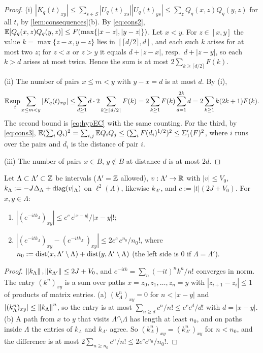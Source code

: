 \begin{proof}
(i) $|K_q(t)_{xy}|\le\sum_{s\in S}|U_q(t)_{xs}||U_q(t)_{ys}|\le\sum_z Q_q(x,z)Q_q(y,z)$ for all $t$, by
\cref{lem:consequences}(b).  By \eqref{eq:cons2},
$\mathbb{E}[Q_q(x,z)Q_q(y,z)]\le F(\max\{|x-z|,|y-z|\})$.  Let $x<y$.  For $z\in[x,y]$ the value
$k=\max\{z-x,y-z\}$ lies in $[\lceil d/2\rceil,d]$, and each such $k$ arises for at most two $z$; for $z<x$
or $z>y$ it equals $d+|z-x|$, resp.\ $d+|z-y|$, so each $k>d$ arises at most twice.  Hence the sum is at
most $2\sum_{k\ge\lceil d/2\rceil}F(k)$.

(ii) The number of pairs $x\le m<y$ with $y-x=d$ is at most $d$.  By (i),
\[
  \mathbb{E}\sup_t\sum_{x\le m<y}|K_q(t)_{xy}|\le\sum_{d\ge1}d\cdot2\sum_{k\ge\lceil d/2\rceil}F(k)
  =2\sum_{k\ge1}F(k)\sum_{d=1}^{2k}d=2\sum_{k\ge1}k(2k+1)F(k).
\]
The second bound is \eqref{eq:hypEC} with the same counting.  For the third, by \eqref{eq:cons3},
$\mathbb{E}(\sum_iQ_i)^2=\sum_{i,j}\mathbb{E} Q_iQ_j\le(\sum_iF(d_i)^{1/2})^2\le\Sigma_1'(F)^2$, where $i$ runs over the pairs
and $d_i$ is the distance of pair $i$.

(iii) The number of pairs $x\in B$, $y\notin B$ at distance $d$ is at most $2d$.
\end{proof}

\begin{lemma}\label{lem:propagation}
Let $\Lambda\subset\Lambda'\subset\mathbb{Z}$ be intervals ($\Lambda'=\mathbb{Z}$ allowed), $v:\Lambda'\to\mathbb{R}$ with $|v|\le V_0$,
$k_{\Lambda}:=-J\Delta_\Lambda+\operatorname{diag}(v|_\Lambda)$ on $\ell^2(\Lambda)$, likewise $k_{\Lambda'}$, and $c:=|t|(2J+V_0)$.  For
$x,y\in\Lambda$:
\begin{enumerate}[label=(\alph*)]
\item $|(e^{-itk_\Lambda})_{xy}|\le e^{c}\,c^{|x-y|}/|x-y|!$;
\item $|(e^{-itk_\Lambda})_{xy}-(e^{-itk_{\Lambda'}})_{xy}|\le2e^{c}\,c^{n_0}/n_0!$, where
$n_0:=\operatorname{dist}(x,\Lambda'\setminus\Lambda)+\operatorname{dist}(y,\Lambda'\setminus\Lambda)$ (the left side is $0$ if $\Lambda=\Lambda'$).
\end{enumerate}
\end{lemma}

\begin{proof}
$\left\|k_\Lambda\right\|,\left\|k_{\Lambda'}\right\|\le2J+V_0$, and $e^{-itk}=\sum_n(-it)^nk^n/n!$ converges in norm.  The
entry $(k^n)_{xy}$ is a sum over paths $x=z_0,z_1,\dots,z_n=y$ with $|z_{i+1}-z_i|\le1$ of products of matrix
entries.  (a) $(k_\Lambda^n)_{xy}=0$ for $n<|x-y|$ and $|(k^n_\Lambda)_{xy}|\le\left\|k_\Lambda\right\|^n$, so the entry is at
most $\sum_{n\ge d}c^n/n!\le e^cc^d/d!$ with $d=|x-y|$.  (b) A path from $x$ to $y$ that visits
$\Lambda'\setminus\Lambda$ has length at least $n_0$, and on paths inside $\Lambda$ the entries of $k_\Lambda$ and
$k_{\Lambda'}$ agree.  So $(k_\Lambda^n)_{xy}=(k^n_{\Lambda'})_{xy}$ for $n<n_0$, and the difference is at most
$2\sum_{n\ge n_0}c^n/n!\le2e^cc^{n_0}/n_0!$.
\end{proof}

